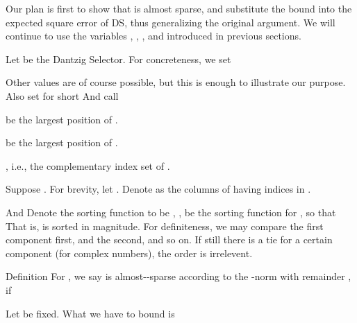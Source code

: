 \startchapter [title={Theorems and Proofs}]

Our plan is first to show that  is almost sparse, and substitute the bound into the expected square error of DS, thus generalizing the original argument.
We will continue to use the variables , , , and  introduced in previous sections.

\startsection [title={Almost-Sparsity of Angular Channel}]

Let  be the Dantzig Selector.
For concreteness, we set

Other values are of course possible, but this is enough to illustrate our purpose.
Also set for short
And call
\startitemize [1]
\item {} be the largest  position of .
\item {} be the largest  position of .
\item {}, i.e., the complementary index set of .
\stopitemize

Suppose .
For brevity, let .
Denote as  the columns of  having indices in .

And Denote the sorting function to be , , be the sorting function for , so that
That is,  is sorted in magnitude.
For definiteness, we may compare the first component first, and the second, and so on.
If still there is a tie for a certain component (for complex numbers), the order is irrelevent.

\Result
{Definition}
{
For , we say  is almost--sparse according to the -norm with remainder , if
}

Let \m {\f} be fixed.
What we have to bound is

